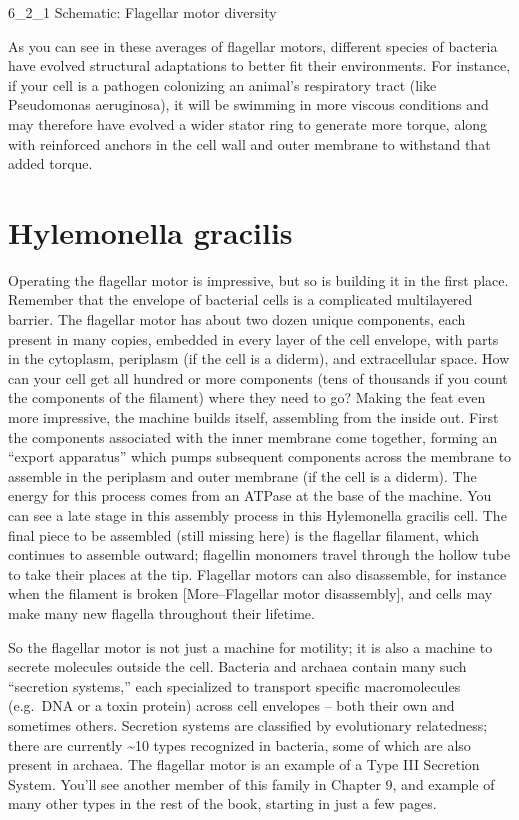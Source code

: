 \documentclass[]{tufte-book}
\begin{document}
6\_2\_1 Schematic: Flagellar motor diversity

As you can see in these averages of flagellar motors, different species
of bacteria have evolved structural adaptations to better fit their
environments. For instance, if your cell is a pathogen colonizing an
animal's respiratory tract (like Pseudomonas aeruginosa), it will be
swimming in more viscous conditions and may therefore have evolved a
wider stator ring to generate more torque, along with reinforced anchors
in the cell wall and outer membrane to withstand that added torque.

\section{Hylemonella gracilis}\label{hylemonella-gracilis-1}

Operating the flagellar motor is impressive, but so is building it in
the first place. Remember that the envelope of bacterial cells is a
complicated multilayered barrier. The flagellar motor has about two
dozen unique components, each present in many copies, embedded in every
layer of the cell envelope, with parts in the cytoplasm, periplasm (if
the cell is a diderm), and extracellular space. How can your cell get
all hundred or more components (tens of thousands if you count the
components of the filament) where they need to go? Making the feat even
more impressive, the machine builds itself, assembling from the inside
out. First the components associated with the inner membrane come
together, forming an ``export apparatus'' which pumps subsequent
components across the membrane to assemble in the periplasm and outer
membrane (if the cell is a diderm). The energy for this process comes
from an ATPase at the base of the machine. You can see a late stage in
this assembly process in this Hylemonella gracilis cell. The final piece
to be assembled (still missing here) is the flagellar filament, which
continues to assemble outward; flagellin monomers travel through the
hollow tube to take their places at the tip. Flagellar motors can also
disassemble, for instance when the filament is broken {[}More--Flagellar
motor disassembly{]}, and cells may make many new flagella throughout
their lifetime.

So the flagellar motor is not just a machine for motility; it is also a
machine to secrete molecules outside the cell. Bacteria and archaea
contain many such ``secretion systems,'' each specialized to transport
specific macromolecules (e.g.~DNA or a toxin protein) across cell
envelopes -- both their own and sometimes others. Secretion systems are
classified by evolutionary relatedness; there are currently
\textasciitilde{}10 types recognized in bacteria, some of which are also
present in archaea. The flagellar motor is an example of a Type III
Secretion System. You'll see another member of this family in Chapter 9,
and example of many other types in the rest of the book, starting in
just a few pages.
\end{document}
